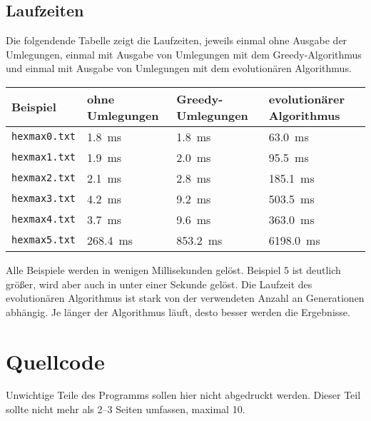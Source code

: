 \documentclass[a4paper,10pt,ngerman]{scrartcl}
\begin{document}
\subsection{Laufzeiten}
Die folgendende Tabelle zeigt die Laufzeiten, jeweils einmal ohne Ausgabe der Umlegungen, einmal mit Ausgabe von Umlegungen mit dem Greedy-Algorithmus und einmal mit Ausgabe von Umlegungen mit dem evolutionären Algorithmus.
\begin{table}[H]
    \centering
    \begin{tabular}{llll}
        \toprule
        Beispiel & ohne  Umlegungen &  Greedy-Umlegungen & evolutionärer Algorithmus\\ \midrule
        \texttt{hexmax0.txt} & \SI{1.8}{\milli\second} & \SI{1.8}{\milli\second} &  \SI{  63.0}{\milli\second}\\
        \texttt{hexmax1.txt} & \SI{1.9}{\milli\second} & \SI{2.0}{\milli\second}&   \SI{  95.5}{\milli\second}\\
        \texttt{hexmax2.txt} & \SI{2.1}{\milli\second} & \SI{2.8}{\milli\second}&   \SI{ 185.1}{\milli\second}\\
        \texttt{hexmax3.txt} & \SI{4.2}{\milli\second} & \SI{9.2}{\milli\second}&   \SI{ 503.5}{\milli\second} \\
        \texttt{hexmax4.txt} & \SI{3.7}{\milli\second} & \SI{9.6}{\milli\second}&   \SI{ 363.0}{\milli\second} \\
        \texttt{hexmax5.txt} & \SI{268.4}{\milli\second} & \SI{853.2}{\milli\second}& \SI{6198.0}{\milli\second}\\
        \bottomrule
    \end{tabular}
\end{table}
Alle Beispiele werden in wenigen Millisekunden gelöst. Beispiel 5 ist deutlich größer, wird aber auch in unter einer Sekunde gelöst. 
Die Laufzeit des evolutionären Algorithmus ist stark von der verwendeten Anzahl an Generationen abhängig. Je länger der Algorithmus läuft, desto besser werden die Ergebnisse.
\section{Quellcode}
Unwichtige Teile des Programms sollen hier nicht abgedruckt werden. Dieser Teil sollte nicht mehr als 2–3 Seiten umfassen, maximal 10.
\end{document}
